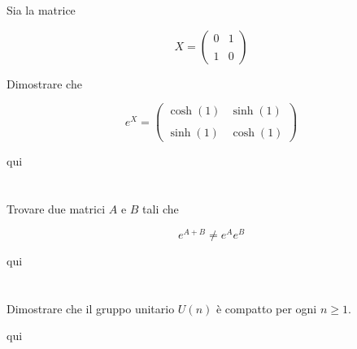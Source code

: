 \begin{tcolorbox}
	Sia la matrice
	
	\begin{equation}
		X = \begin{pmatrix} 0 & 1 \\\\ 1 & 0 \end{pmatrix}
	\end{equation}

	Dimostrare che
	
	\begin{equation}
		e^{X} = \begin{pmatrix} \cosh(1) & \sinh(1) \\\\ \sinh(1) & \cosh(1) \end{pmatrix}
	\end{equation}
\end{tcolorbox}

qui

%

\newpage

%

\section{}\label{es3-4}

\begin{tcolorbox}
	Trovare due matrici $ A $ e $ B $ tali che
	
	\begin{equation}
		e^{A+B} \neq e^{A} e^{B}
	\end{equation}
\end{tcolorbox}

qui

%

\newpage

%

\section{}\label{es3-5}

\begin{tcolorbox}
	Dimostrare che il gruppo unitario $ U(n) $ è compatto per ogni $ n \geqslant 1 $.
\end{tcolorbox}

qui

%

\newpage

%


